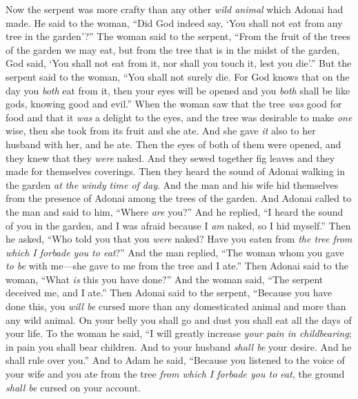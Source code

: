 \begin{biblechapter} %
 Now the serpent was more crafty than any other \textit{wild animal} which Adonai had made. He said to the woman, “Did God indeed say, ‘You shall not eat from any tree in the garden’?”
\verse The woman said to the serpent, “From the fruit of the trees of the garden we may eat,
\verse but from the tree that is in the midst of the garden, God said, ‘You shall not eat from it, nor shall you touch it, lest you die’.”
\verse But the serpent said to the woman, “You shall not surely die.
\verse For God knows that on the day you \textit{both} eat from it, then your eyes will be opened and you \textit{both} shall be like gods, knowing good and evil.”
\verse When the woman saw that the tree \textit{was} good for food and that it \textit{was} a delight to the eyes, and the tree was desirable to make \textit{one} wise, then she took from its fruit and she ate. And she gave \textit{it} also to her husband with her, and he ate.
\verse Then the eyes of both of them were opened, and they knew that they \textit{were} naked. And they sewed together fig leaves and they made for themselves coverings.
\verse Then they heard the sound of Adonai walking in the garden \textit{at the windy time of day}. And the man and his wife hid themselves from the presence of Adonai among the trees of the garden.
\verse And Adonai called to the man and said to him, “Where \textit{are} you?”
\verse And he replied, “I heard the sound of you in the garden, and I was afraid because I \textit{am} naked, so I hid myself.”
\verse Then he asked, “Who told you that you \textit{were} naked? Have you eaten from \textit{the tree from which I forbade you to eat}?”
\verse And the man replied, “The woman whom you gave \textit{to be} with me—she gave to me from the tree and I ate.”
\verse Then Adonai said to the woman, “What \textit{is} this you have done?” And the woman said, “The serpent deceived me, and I ate.”
\verse Then Adonai said to the serpent,
\verse “Because you have done this, 
you \textit{will be} cursed 
more than any domesticated animal 
and more than any wild animal. 
On your belly you shall go 
and dust you shall eat 
all the days of your life.
\verse To the woman he said, “I will greatly increase 
\textit{your pain in childbearing}; 
in pain you shall bear children. 
And to your husband \textit{shall be} your desire. 
And he shall rule over you.”
\verse And to Adam he said, “Because you listened to the voice of your wife and you ate from the tree \textit{from which I forbade you to eat},
\verse the ground \textit{shall be} cursed on your account. 

\end{biblechapter}
